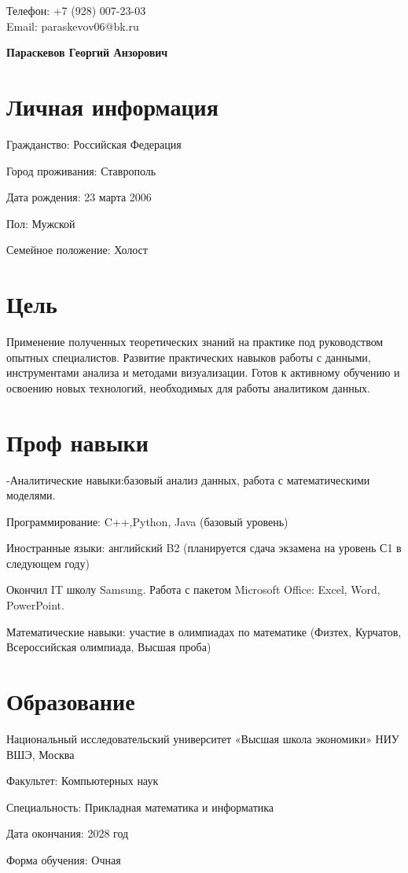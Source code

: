 \documentclass{article}
\makeatletter
\newcommand{\authorinfo}{%
  \begin{flushleft}
    \textbf{Параскевов Георгий Анзорович}
  \end{flushleft}
}
\newcommand{\contacts}{
  \begin{flushright}
    \small
    Телефон: +7 (928) 007-23-03\\
    Email: paraskevov06@bk.ru\\
  \end{flushright}
}
\makeatother
\begin{document}
\contacts
\authorinfo
\section*{Личная информация}
Гражданство: Российская Федерация

Город проживания: Ставрополь

Дата рождения: 23 марта 2006 

Пол: Мужской

Семейное положение: Холост

\section*{Цель}
Применение полученных теоретических знаний на практике под руководством опытных специалистов. Развитие практических навыков работы с данными, инструментами анализа и методами визуализации. Готов к активному обучению и освоению новых технологий, необходимых для работы аналитиком данных. 
\section*{Проф навыки}
-Аналитические навыки:базовый анализ данных, работа с математическими моделями.

Программирование: C++,Python, Java (базовый уровень)

Иностранные языки:
английский B2 (планируется сдача экзамена на уровень С1 в следующем году) 

Окончил IT школу Samsung. Работа с пакетом Microsoft Office: Excel, Word, PowerPoint.

Математические навыки: участие в олимпиадах по математике (Физтех, Курчатов, Всероссийская олимпиада, Высшая проба)
\section{Образование}
Национальный исследовательский университет «Высшая школа экономики» НИУ ВШЭ, Москва

Факультет: Компьютерных наук

Специальность: Прикладная математика и информатика

Дата окончания: 2028 год

Форма обучения: Очная
\end{document}
